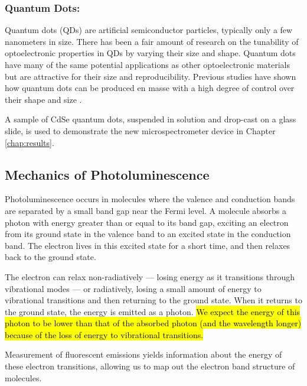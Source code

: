 \subsubsection{Quantum Dots: }\label{chap:intro-optomats-qd}

Quantum dots (QDs) are artificial semiconductor particles, typically only a few nanometers in size. There has been a fair amount of research on the tunability of optoelectronic properties in QDs by varying their size and shape. Quantum dots have many of the same potential applications as other optoelectronic materials but are attractive for their size and reproducibility. Previous studies have shown how quantum dots can be produced en masse with a high degree of control over their shape and size \cite{empedocles_photoluminescence_1996, murray_synthesis_2000}.

A sample of CdSe quantum dots, suspended in solution and drop-cast on a glass slide, is used to demonstrate the new microspectrometer device in Chapter \ref{chap:results}.

\subsection{Mechanics of Photoluminescence}
Photoluminescence occurs in molecules where the valence and conduction bands are separated by a small band gap near the Fermi level. A molecule absorbs a photon with energy greater than or equal to its band gap, exciting an electron from its ground state in the valence band to an excited state in the conduction band. The electron lives in this excited state for a short time, and then relaxes back to the ground state.

The electron can relax non-radiatively --- losing energy as it transitions through vibrational modes --- or radiatively, losing a small amount of energy to vibrational transitions and then returning to the ground state. When it returns to the ground state, the energy is emitted as a photon. \hl{We expect the energy of this photon to be lower than that of the absorbed photon (and the wavelength longer) because of the loss of energy to vibrational transitions.}


Measurement of fluorescent emissions yields information about the energy of these electron transitions, allowing us to map out the electron band structure of molecules.
